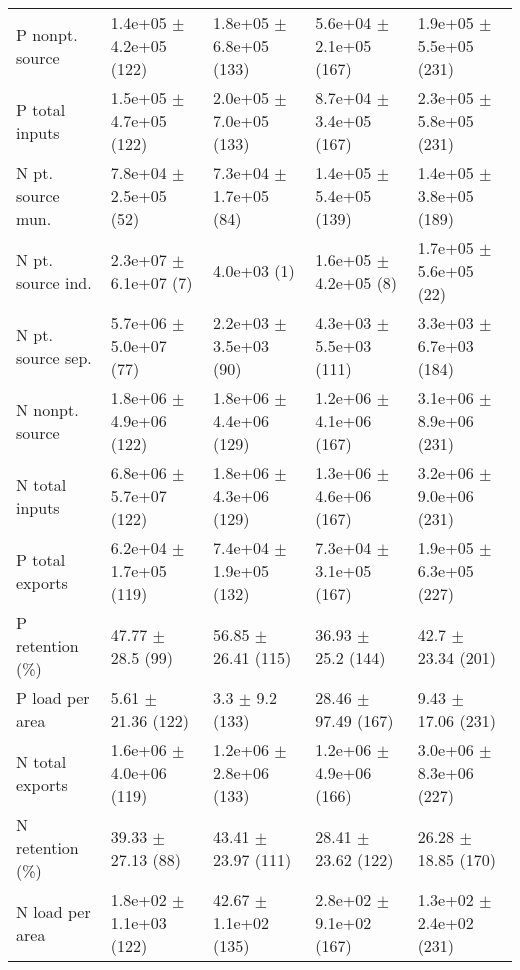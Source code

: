 \documentclass{article}
\begin{document}
\begin{landscape}
\begin{table}[!h]
\begin{tabular}{lllll}
\addlinespace
P nonpt. source & 1.4e+05 $\pm$ 4.2e+05 (122) & 1.8e+05 $\pm$ 6.8e+05 (133) & 5.6e+04 $\pm$ 2.1e+05 (167) & 1.9e+05 $\pm$ 5.5e+05 (231)\\
P total inputs & 1.5e+05 $\pm$ 4.7e+05 (122) & 2.0e+05 $\pm$ 7.0e+05 (133) & 8.7e+04 $\pm$ 3.4e+05 (167) & 2.3e+05 $\pm$ 5.8e+05 (231)\\
N pt. source mun. & 7.8e+04 $\pm$ 2.5e+05 (52) & 7.3e+04 $\pm$ 1.7e+05 (84) & 1.4e+05 $\pm$ 5.4e+05 (139) & 1.4e+05 $\pm$ 3.8e+05 (189)\\
N pt. source ind. & 2.3e+07 $\pm$ 6.1e+07 (7) & 4.0e+03 (1) & 1.6e+05 $\pm$ 4.2e+05 (8) & 1.7e+05 $\pm$ 5.6e+05 (22)\\
N pt. source sep. & 5.7e+06 $\pm$ 5.0e+07 (77) & 2.2e+03 $\pm$ 3.5e+03 (90) & 4.3e+03 $\pm$ 5.5e+03 (111) & 3.3e+03 $\pm$ 6.7e+03 (184)\\
\addlinespace
N nonpt. source & 1.8e+06 $\pm$ 4.9e+06 (122) & 1.8e+06 $\pm$ 4.4e+06 (129) & 1.2e+06 $\pm$ 4.1e+06 (167) & 3.1e+06 $\pm$ 8.9e+06 (231)\\
N total inputs & 6.8e+06 $\pm$ 5.7e+07 (122) & 1.8e+06 $\pm$ 4.3e+06 (129) & 1.3e+06 $\pm$ 4.6e+06 (167) & 3.2e+06 $\pm$ 9.0e+06 (231)\\
P total exports & 6.2e+04 $\pm$ 1.7e+05 (119) & 7.4e+04 $\pm$ 1.9e+05 (132) & 7.3e+04 $\pm$ 3.1e+05 (167) & 1.9e+05 $\pm$ 6.3e+05 (227)\\
P retention (\%) & 47.77 $\pm$ 28.5 (99) & 56.85 $\pm$ 26.41 (115) & 36.93 $\pm$ 25.2 (144) & 42.7 $\pm$ 23.34 (201)\\
P load per area & 5.61 $\pm$ 21.36 (122) & 3.3 $\pm$ 9.2 (133) & 28.46 $\pm$ 97.49 (167) & 9.43 $\pm$ 17.06 (231)\\
\addlinespace
N total exports & 1.6e+06 $\pm$ 4.0e+06 (119) & 1.2e+06 $\pm$ 2.8e+06 (133) & 1.2e+06 $\pm$ 4.9e+06 (166) & 3.0e+06 $\pm$ 8.3e+06 (227)\\
N retention (\%) & 39.33 $\pm$ 27.13 (88) & 43.41 $\pm$ 23.97 (111) & 28.41 $\pm$ 23.62 (122) & 26.28 $\pm$ 18.85 (170)\\
N load per area & 1.8e+02 $\pm$ 1.1e+03 (122) & 42.67 $\pm$ 1.1e+02 (135) & 2.8e+02 $\pm$ 9.1e+02 (167) & 1.3e+02 $\pm$ 2.4e+02 (231)\\
\bottomrule
\end{tabular}
\end{table}
\end{landscape}
\end{document}
